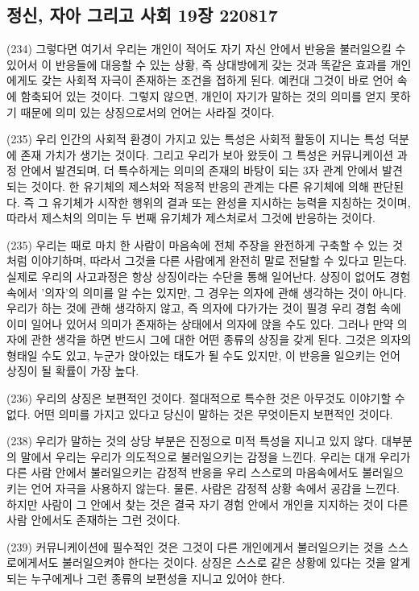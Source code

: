 \documentclass[12pt, a4paper]{article}
\begin{document}
\newpage
\subsection{정신, 자아 그리고 사회 19장 220817}
(234) 그렇다면 여기서 우리는 개인이 적어도 자기 자신 안에서 반응을 불러일으킬 수 있어서 이 반응들에 대응할 수 있는 상황, 즉 상대방에게 갖는 것과 똑같은 효과를 개인에게도 갖는 사회적 자극이 존재하는 조건을 접하게 된다. 예컨대 그것이 바로 언어 속에 함축되어 있는 것이다. 그렇지 않으면, 개인이 자기가 말하는 것의 의미를 얻지 못하기 때문에 의미 있는 상징으로서의 언어는 사라질 것이다.

(235) 우리 인간의 사회적 환경이 가지고 있는 특성은 사회적 활동이 지니는 특성 덕분에 존재 가치가 생기는 것이다. 그리고 우리가 보아 왔듯이 그 특성은 커뮤니케이션 과정 안에서 발견되며, 더 특수하게는 의미의 존재의 바탕이 되는 3자 관계 안에서 발견되는 것이다. 한 유기체의 제스처와 적응적 반응의 관계는 다른 유기체에 의해 판단된다. 즉 그 유기체가 시작한 행위의 결과 또는 완성을 지시하는 능력을 지칭하는 것이며, 따라서 제스처의 의미는 두 번째 유기체가 제스처로서 그것에 반응하는 것이다. 

(235) 우리는 때로 마치 한 사람이 마음속에 전체 주장을 완전하게 구축할 수 있는 것처럼 이야기하며, 따라서 그것을 다른 사람에게 완전히 말로 전달할 수 있다고 믿는다. 실제로 우리의 사고과정은 항상 상징이라는 수단을 통해 일어난다. 상징이 없어도 경험 속에서 '의자'의 의미를 알 수는 있지만, 그 경우는 의자에 관해 생각하는 것이 아니다. 우리가 하는 것에 관해 생각하지 않고, 즉 의자에 다가가는 것이 필경 우리 경험 속에 이미 일어나 있어서 의미가 존재하는 상태에서 의자에 앉을 수도 있다. 그러나 만약 의자에 관한 생각을 하면 반드시 그에 대한 어떤 종류의 상징을 갖게 된다. 그것은 의자의 형태일 수도 있고, 누군가 앉아있는 태도가 될 수도 있지만, 이 반응을 일으키는 언어 상징이 될 확률이 가장 높다.

(236) 우리의 상징은 보편적인 것이다. 절대적으로 특수한 것은 아무것도 이야기할 수 없다. 어떤 의미를 가지고 있다고 당신이 말하는 것은 무엇이든지 보편적인 것이다.

(238) 우리가 말하는 것의 상당 부분은 진정으로 미적 특성을 지니고 있지 않다. 대부분의 말에서 우리는 우리가 의도적으로 불러일으키는 감정을 느낀다. 우리는 대개 우리가 다른 사람 안에서 불러일으키는 감정적 반응을 우리 스스로의 마음속에서도 불러일으키는 언어 자극을 사용하지 않는다. 물론, 사람은 감정적 상황 속에서 공감을 느낀다. 하지만 사람이 그 안에서 찾는 것은 결국 자기 경험 안에서 개인을 지지하는 것이 다른 사람 안에서도 존재하는 그런 것이다. 

(239) 커뮤니케이션에 필수적인 것은 그것이 다른 개인에게서 불러일으키는 것을 스스로에게서도 불러일으켜야 한다는 것이다. 상징은 스스로 같은 상황에 있다는 것을 알게 되는 누구에게나 그런 종류의 보편성을 지니고 있어야 한다. 
\end{document}
